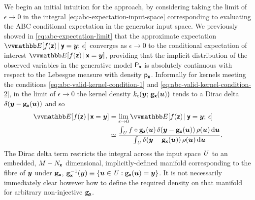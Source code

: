 We begin an initial intuition for the approach, by considering taking the limit of $\epsilon \to 0$ in the integral \eqref{eq:abc-expectation-input-space} corresponding to evaluating the \ac{ABC} conditional expectation in the generator input space. We previously showed in \eqref{eq:abc-expectation-limit} that the approximate expectation $\expc{f(\rvct{z}) \gvn \rvct{y}= \vct{y};\,\epsilon}$ converges as $\epsilon \to 0$ to the conditional expectation of interest $\expc{f(\rvct{z}) \gvn \rvct{x} = \vct{y}}$, providing that the implicit distribution of the observed variables in the generative model $\mathsf{P}_{\boldsymbol{\mathsf{x}}}$ is absolutely continuous with respect to the Lebesgue measure with density $\mathsf{p}_{\boldsymbol{\mathsf{x}}}$. Informally for kernels meeting the conditions \eqref{eq:abc-valid-kernel-condition-1} and \eqref{eq:abc-valid-kernel-condition-2}, in the limit of $\epsilon \to 0$ the kernel density $k_\epsilon\lpa{\vct{y}};\,\genfunc_{\rvct{x}}(\vct{u})\rpa$ tends to a Dirac delta ${\delta}\lpa\vct{y} - \genfunc_{\rvct{x}}(\vct{u})\rpa$ and so
\begin{align}\label{eq:expectation-input-space-limit}
  \expc{f(\rvct{z}) \gvn \rvct{x}=\vct{y}} &=
  \lim_{\epsilon\to 0}  \expc{f(\rvct{z}) \gvn \rvct{y}=\vct{y};\,\epsilon} 
  \\
  &\simeq
  \frac{
  \int_{\set{U}} 
    f\circ\genfunc_{\rvct{z}}(\vct{u}) \,
    \delta\lpa\vct{y} - \genfunc_{\rvct{x}}(\vct{u})\rpa\,
    \rho(\vct{u})
  \,\dr\vct{u}
  }
  {
    \int_{\set{U}} 
    \delta\lpa\vct{y} - \genfunc_{\rvct{x}}(\vct{u})\rpa\,
    \rho(\vct{u})
  \,\dr\vct{u}
  }.
\end{align}
The Dirac delta term restricts the integral across the input space $\mathit{U}$ to an embedded, $M - N_{\boldsymbol{\mathsf{x}}}$ dimensional, implicitly-defined manifold corresponding to the fibre of $\boldsymbol{y}$ under ${\mathbf{g}}_{\boldsymbol{\mathsf{x}}}$, $\preimage{\genfunc_{\rvct{x}}}{\vct{y}} \equiv \fset{\vct{u} \in \set{U} :  \genfunc_{\rvct{x}}(\vct{u}) = \vct{y}}$. It is not necessarily immediately clear however how to define the required density on that manifold for arbitrary non-injective ${\mathbf{g}}_{\boldsymbol{\mathsf{x}}}$.


